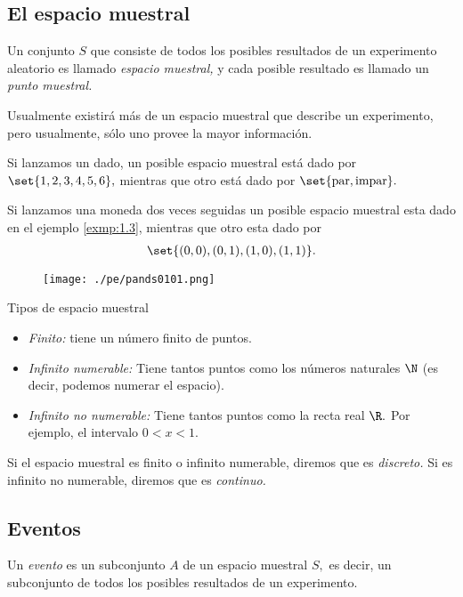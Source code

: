 \subsection{El espacio muestral}
{}
Un conjunto $S$ que consiste de todos los posibles resultados de un experimento aleatorio es llamado \emph{espacio muestral,}  y cada posible resultado es llamado un \emph{punto muestral.}

Usualmente existirá más de un espacio muestral que describe un experimento, pero usualmente, sólo uno provee la mayor información.

{}
\begin{exmp}
 \label{exmp:1.6}
 Si lanzamos un dado, un posible espacio muestral está dado por $\set{1,2,3,4,5,6},$  mientras que otro está dado por $\set{\text{par},\text{impar}}.$
\end{exmp}


{}
\begin{exmp}
 \label{exmp:1.7}
 Si lanzamos una moneda dos veces seguidas un posible espacio muestral esta dado en el ejemplo \ref{exmp:1.3},  mientras que otro esta dado por
 \begin{align*}
\set{(0,0), (0,1), (1,0),(1,1)}.
\end{align*}
\end{exmp}



\begin{figure}
 \centering
 \texttt{[image: ./pe/pands0101.png]}
 \label{fig:0101}
\end{figure}


{Tipos de espacio muestral}
\begin{itemize}
 \item \emph{Finito:} tiene un número finito de puntos.
 \item \emph{Infinito numerable:} Tiene tantos puntos como los números naturales $\N$ (es decir, podemos numerar el espacio).
 \item \emph{Infinito no numerable:} Tiene tantos puntos como la recta real $\R.$  Por ejemplo, el intervalo $0<x<1.$
\end{itemize}


{}
Si el espacio muestral es finito o infinito numerable, diremos que es \emph{discreto.}  Si es infinito no numerable, diremos que es \emph{continuo.}

\subsection{Eventos}
{}
Un \emph{evento} es un subconjunto $A$ de un espacio muestral $S,$ es decir, un subconjunto de todos los posibles resultados de un experimento. 

